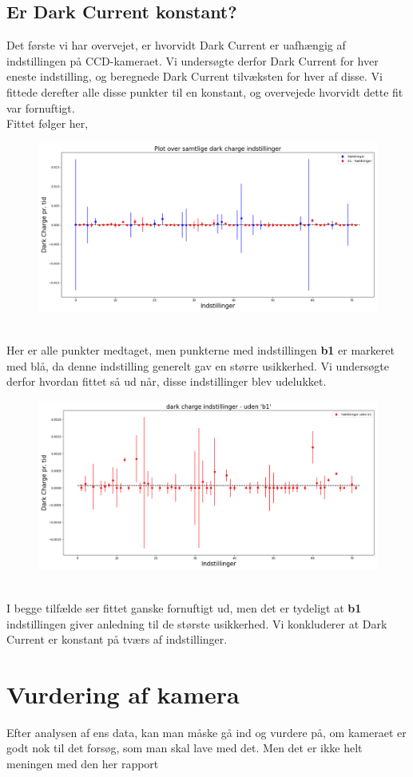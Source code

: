 \documentclass[working]{tuftebook}
\begin{document}
\subsection{Er Dark Current konstant?}
Det første vi har overvejet, er hvorvidt Dark Current er uafhængig af indstillingen på CCD-kameraet. Vi undersøgte derfor Dark Current for hver eneste indstilling, og beregnede Dark Current tilvæksten for hver af disse. Vi fittede derefter alle disse punkter til en konstant, og overvejede hvorvidt dette fit var fornuftigt.
\\
Fittet følger her,
\begin{figure}[ht]
	\centering
	\includegraphics[width = \textwidth]{Plots/dark_hældninger_1.png}
\end{figure}
\\
Her er alle punkter medtaget, men punkterne med indstillingen \textbf{b1} er markeret med blå, da denne indstilling generelt gav en større usikkerhed. Vi undersøgte derfor hvordan fittet så ud når, disse indstillinger blev udelukket.
\begin{figure}[ht]
	\centering
	\includegraphics[width = \textwidth]{Plots/dark_hældninger_2.png}
\end{figure}
\\ 
I begge tilfælde ser fittet ganske fornuftigt ud, men det er tydeligt at \textbf{b1} indstillingen giver anledning til de største usikkerhed. Vi konkluderer at Dark Current er konstant på tværs af indstillinger.
\section{Vurdering af kamera}
Efter analysen af ens data, kan man måske gå ind og vurdere på, om kameraet er godt nok til det forsøg, som man skal lave med det. Men det er ikke helt meningen med den her rapport
\printbibliography
\end{document}
